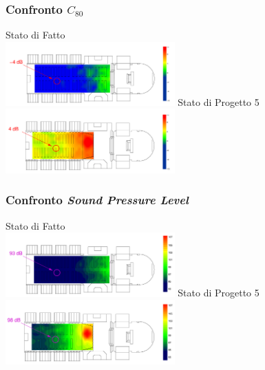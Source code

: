 \documentclass[10pt]{beamer}
\begin{document}
\begin{frame}
  \frametitle{Confronto $C_{80}$}
  \begin{center}
    Stato di Fatto\\
    \vskip 0.3cm
    \includegraphics[width = 6.5cm]{graph/sv-sdf-c80-1k-slides.pdf}
    \vskip 0.3cm
    Stato di Progetto 5 \\
    \includegraphics[width = 6.5cm]{graph/sv-sdp5-c80-1k-slides.pdf}
  \end{center}
\end{frame}

\begin{frame}
  \frametitle{Confronto \em Sound Pressure Level \em}
  \begin{center}
    Stato di Fatto\\
    \includegraphics[width = 6.5cm]{graph/sv-sdf-Leq-A-slides.pdf}
    \vskip 0.3cm
    Stato di Progetto 5 \\
    \includegraphics[width = 6.5cm]{graph/sv-sdp5-Leq-A-slides.pdf}
  \end{center}
\end{frame}
\end{document}
